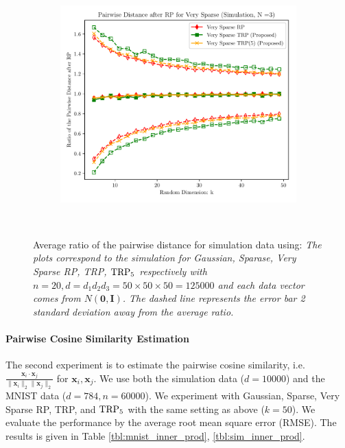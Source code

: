 \begin{figure}[ht!]
\begin{subfigure}{0.32\textwidth}
		\includegraphics[scale = 0.3]{figure/dist_sp1_d125000.pdf}
	\end{subfigure}\\
	\caption{Average ratio of the pairwise distance for simulation data using: \textit{The plots correspond to the simulation for Gaussian, Sparase, Very Sparse RP, TRP, $\textup{TRP}_5$ respectively with $n = 20, d = d_1d_2d_3 = 50 \times 50 \times 50 = 125000$ and each data vector comes from $N(\mathbf{0}, \mathbf{I})$. The dashed line represents the error bar 2 standard deviation away from the average ratio.}} 
	\label{fig:triple_krao}
\end{figure}


\paragraph{Pairwise Cosine Similarity Estimation} 
The second experiment is to estimate the pairwise cosine similarity, i.e. $\frac{\mathbf{x}_i \cdot \mathbf{x}_j}{\|\mathbf{x}_i\|_2 \|\mathbf{x}_j\|_2}$ for $\mathbf{ x}_i, \mathbf{x}_j$. We use both the simulation data ($d = 10000$) and the MNIST data ($d = 784, n = 60000$). We experiment with Gaussian, Sparse, Very Sparse RP, TRP, and $\textup{TRP}_5$ with the same setting as above ($k = 50$). We evaluate the performance by the average root mean square error (RMSE). The results is given in Table  \ref{tbl:mnist_inner_prod}, \ref{tbl:sim_inner_prod}.  

